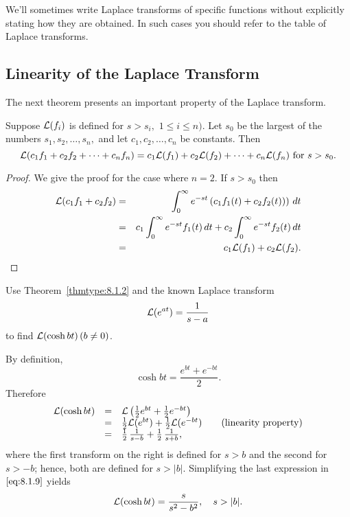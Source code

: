 \documentclass{ximera}
\begin{document}
We'll sometimes write Laplace transforms of specific functions
without explicitly stating how they are obtained. In such cases you
should refer to the table of Laplace transforms.

\subsection*{Linearity of the Laplace Transform}

The next theorem presents an important property of the Laplace
transform.

\begin{theorem}\label{thmtype:8.1.2}
 Suppose ${\cal L}(f_i)$ is defined for
 $s>s_i,$ $1\leq i\leq n)$.
Let $s_0$ be the largest of the numbers $s_1, s_{2}, \dots,s_n,$ and
let
$c_1, c_2,\dots, c_n$ be  constants. Then
$$
{\cal L}(c_1f_1+c_2f_2+\cdots+c_nf_n)=c_1{\cal L}(f_1)+c_2{\cal L}(f_2)
+\cdots+c_n{\cal L}(f_n)\mbox{ for } s>s_0.
$$
\end{theorem}

\begin{proof}
We give the proof for the case where $n=2$. If $s>s_0$ then
\begin{eqnarray*}
{\cal L}(c_1f_1+c_2f_2)&=&
\int_0^\infty
e^{-st}\left(c_1f_1(t)+c_2f_2(t))\right)\,dt\\
&=&c_1\int_0^\infty e^{-st}f_1(t)\,dt+c_2\int_0^\infty e^{-st}f_2(t)\,dt\\
&=&c_1{\cal L}(f_1)+c_2{\cal L}(f_2).
\end{eqnarray*}
\end{proof}

\begin{example}\label{example:8.1.6}
Use Theorem~\ref{thmtype:8.1.2} and the known Laplace transform
$$
{\cal L}(e^{at})=\frac{1}{s-a}
$$
 to find ${\cal L}(\cosh bt)\,(b\neq 0)$.


\begin{explanation}  By definition,
$$
\cosh bt=\frac{e^{bt}+e^{-bt}}{2}.
$$
Therefore
\begin{equation}\label{eq:8.1.9}
\begin{array}{ccl}
{\cal L}(\cosh bt)&=& {\cal L}\left(\frac{1}{2} e^{bt}+\frac{1}{2}e^{-bt}\right)\\%
&=&\frac{1}{2} {\cal L}(e^{bt}) +\frac{1}{2} {\cal L}(e^{-bt})
\qquad
\mbox{(linearity property)}\\%
&=&\frac{1}{2}\,\frac{1}{s-b} +\frac{1}{2}\,\frac{1}{s+b},
\end{array}
\end{equation}
where the first transform on the right is defined for $s>b$ and the
second
for $s>-b$; hence, both are defined for $s>|b|$.  Simplifying the
last expression in $\eqref{eq:8.1.9}$ yields
$$
{\cal L}(\cosh bt)=\frac{s}{s^2-b^2},\quad s>|b|.
$$
\end{explanation}
\end{example}
\end{document}
